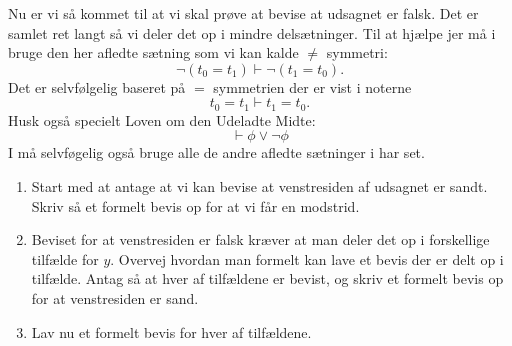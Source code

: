 Nu er vi så kommet til at vi skal prøve at bevise at udsagnet er falsk. Det er samlet ret langt så vi deler det op i mindre delsætninger.
Til at hjælpe jer må i bruge den her afledte sætning som vi kan kalde $\neq$ symmetri: 
\[\neg (t_0 = t_1) \vdash \neg(t_1 = t_0).\]
Det er selvfølgelig baseret på $=$ symmetrien der er vist i noterne
\[t_0=t_1 \vdash t_1=t_0.\]
Husk også specielt Loven om den Udeladte Midte:
\[
	\vdash \phi \lor \neg\phi
\]
I må selvføgelig også bruge alle de andre afledte sætninger i har set.
\begin{enumerate}
\item Start med at antage at vi kan bevise at venstresiden af udsagnet er sandt. Skriv så et formelt bevis op for at vi får en modstrid.
\item Beviset for at venstresiden er falsk kræver at man deler det op i forskellige tilfælde for $y$. Overvej hvordan man formelt kan lave et
bevis der er delt op i tilfælde. Antag så at hver af tilfældene er bevist, og skriv et formelt bevis op for at venstresiden er sand.
\item Lav nu et formelt bevis for hver af tilfældene.
\end{enumerate}

\ifdefined\startProjektTwo\fi
